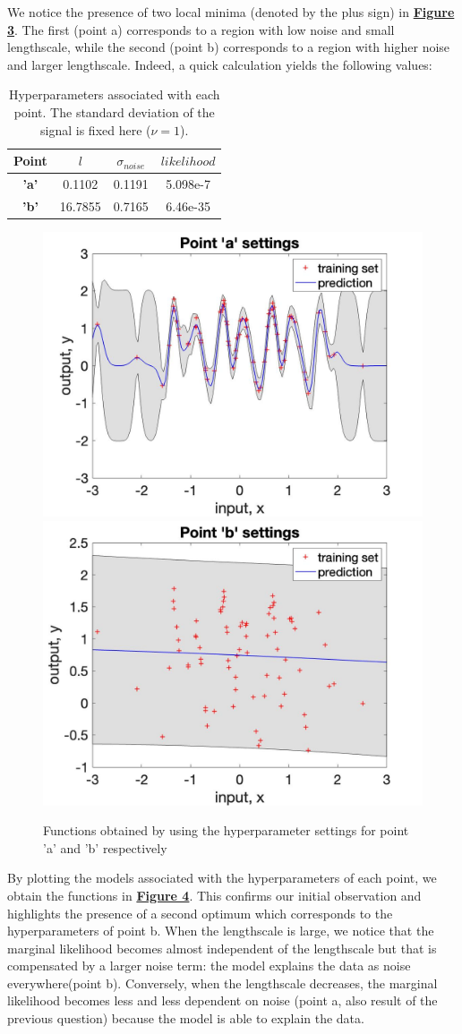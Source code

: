 \documentclass[a4paper,11pt]{article}
\begin{document}
\noindent
We notice the presence of two local minima (denoted by the plus sign) in \hyperref[fig:3]{\textbf{Figure 3}}. The first (point a) corresponds to a region with low noise and small lengthscale, while the second (point b) corresponds to a region with higher noise and larger lengthscale. Indeed, a quick calculation yields the following values:

	\begin{table}[H]
	\centering
	\begin{tabular}{| c  | c | c | c |}
		\hline
		\textbf{Point} & \textbf{$l$} &  \textbf{$\sigma_{noise}$}& $likelihood$ \\
		\hline \hline
		\textbf{'a'} & 0.1102 & 0.1191  & 5.098e-7\\
		\hline
		\textbf{'b'} & 16.7855 & 0.7165 & 6.46e-35 \\
		\hline
	\end{tabular}
	\caption{Hyperparameters associated with each point. The standard deviation of the signal is fixed here ($\nu = 1$).}
	\end{table}
\begin{figure}[h]
	\centering
	\includegraphics[width=.48\linewidth]{figures/bpointa.jpg}
	\includegraphics[width=.48\linewidth]{figures/bpointb.jpg}
	\caption{Functions obtained by using the hyperparameter settings for point 'a' and 'b' respectively}
	\label{fig:4}
\end{figure}
By plotting the models associated with the hyperparameters of each point, we obtain the functions in \hyperref[fig:4]{\textbf{Figure 4}}. This confirms our initial observation and highlights the presence of a second optimum which corresponds to the hyperparameters of point b. When the lengthscale is large, we notice that the marginal likelihood becomes almost independent of the lengthscale but that is compensated by a larger noise term: the model explains the data as noise everywhere(point b). Conversely, when the lengthscale decreases, the marginal likelihood becomes less and less dependent on noise (point a, also result of the previous question) because the model is able to explain the data.\\
\end{document}
